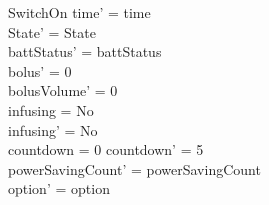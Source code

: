 \begin{schema}{SwitchOn}
	time' = time\\ State' = State\\
	battStatus' = battStatus\\
	bolus' = 0\\
	bolusVolume' = 0\\
	infusing = No\\
	infusing' = No\\
	countdown = 0 \land countdown' = 5\\
	powerSavingCount' = powerSavingCount\\ option' = option\\
\end{schema}

